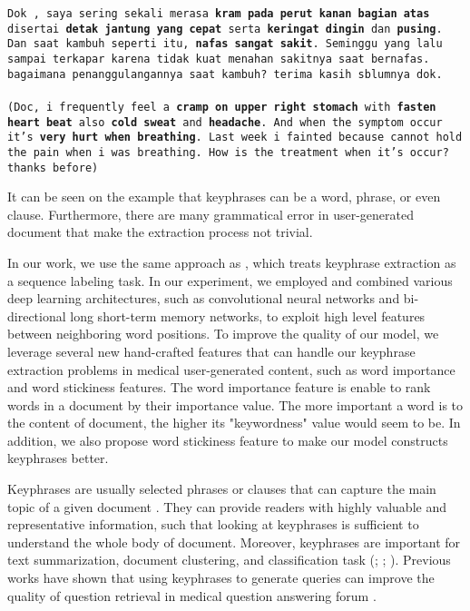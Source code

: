 	\texttt{Dok , saya sering sekali merasa \textbf{kram pada perut kanan bagian atas} disertai \textbf{detak jantung yang cepat} serta \textbf{keringat dingin} dan \textbf{pusing}. Dan saat kambuh seperti itu, \textbf{nafas sangat sakit}. Seminggu yang lalu sampai terkapar karena tidak kuat menahan sakitnya saat bernafas. bagaimana penanggulangannya saat kambuh? terima kasih sblumnya dok. \\\\
	(Doc, i frequently feel a \textbf{cramp on upper right stomach} with \textbf{fasten heart beat} also \textbf{cold sweat} and \textbf{headache}. And when the symptom occur it's \textbf{very hurt when breathing}. Last week i fainted because cannot hold the pain when i was breathing. How is the treatment when it's occur? thanks before)}

It can be seen on the example that keyphrases can be a word, phrase, or even clause. Furthermore, there are many grammatical error in user-generated document that make the extraction process not trivial.

In our work, we use the same approach as \cite{cao2010automatically}, which treats keyphrase extraction as a sequence labeling task. In our experiment, we employed and combined various deep learning architectures, such as convolutional neural networks and bi-directional long short-term memory networks, to exploit high level features between neighboring word positions. To improve the quality of our model, we leverage several new hand-crafted features that can handle our keyphrase extraction problems in medical user-generated content, such as word importance and word stickiness features. The word importance feature is enable to rank words in a document by their importance value. The more important a word is to the content of document, the higher its "keywordness" value would seem to be. In addition, we also propose word stickiness feature to make our model constructs keyphrases better. 

\iffalse
Keyphrases are usually selected phrases or clauses that can capture the main topic of a given document \cite{turney2000learning}. They can provide readers with highly valuable and representative information, such that looking at keyphrases is sufficient to understand the whole body of document. Moreover, keyphrases are important for text summarization, document clustering, and classification task (\cite{classDocumentEkp1}; \cite{qaEkp}; \cite{gong2009improving}). Previous works have shown that using keyphrases to generate queries can improve the quality of question retrieval in medical question answering forum \cite{cao2010automatically}.


